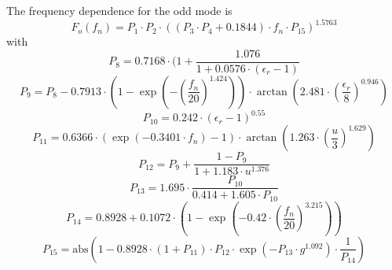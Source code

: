 \documentclass[10pt]{report}
\begin{document}
The frequency dependence for the odd mode is
\begin{equation}
F_o(f_n) = P_1\cdot P_2\cdot ((P_3\cdot P_4 + 0.1844)\cdot f_n\cdot P_{15})^{1.5763}
\end{equation}
with
\begin{equation}
P_8 = 0.7168\cdot (1 + \frac{1.076}{1+0.0576\cdot (\epsilon_r-1)}
\end{equation}
\begin{equation}
P_9 = P_8 - 0.7913\cdot\left( 1-\exp\left( -\left( \frac{f_n}{20}\right) ^{1.424} \right) \right)
     \cdot\arctan\left( 2.481\cdot\left( \frac{\epsilon_r}{8}\right) ^{0.946} \right)
\end{equation}
\begin{equation}
P_{10} = 0.242\cdot (\epsilon_r-1)^{0.55}
\end{equation}
\begin{equation}
P_{11} = 0.6366\cdot (\exp(-0.3401\cdot f_n)-1) \cdot
      \arctan\left(1.263\cdot\left( \frac{u}{3} \right) ^{1.629} \right)
\end{equation}
\begin{equation}
P_{12} = P_9 + \frac{1-P_9}{1+1.183\cdot u^{1.376}}
\end{equation}
\begin{equation}
P_{13} = 1.695\cdot \frac{P_{10}}{0.414+1.605\cdot P_{10}}
\end{equation}
\begin{equation}
P_{14} = 0.8928 + 0.1072\cdot \left( 1-\exp\left(-0.42\cdot\left(
        \frac{f_n}{20} \right) ^{3.215} \right)\right)
\end{equation}
\begin{equation}
P_{15} = \text{abs}\left( 1 - 0.8928\cdot (1+P_{11}) \cdot P_{12}\cdot\exp(-P_{13}\cdot g^{1.092})\cdot
         \frac{1}{P_{14}} \right)
\end{equation}
\end{document}
